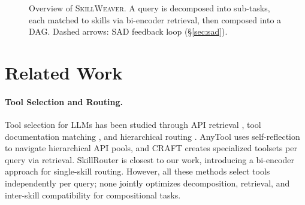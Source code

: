 \documentclass[11pt]{article}
\newcommand{\system}{\textsc{SkillWeaver}}
\begin{document}
\begin{figure}[t]
\caption{Overview of \system{}. A query is decomposed into sub-tasks, each matched to skills via bi-encoder retrieval, then composed into a DAG. Dashed arrows: SAD feedback loop (\S\ref{sec:sad}).}
\label{fig:overview}
\end{figure}

\section{Related Work}
\label{sec:related}

\paragraph{Tool Selection and Routing.}
Tool selection for LLMs has been studied through API retrieval \cite{patil2023gorilla,qin2023toolllm}, tool documentation matching \cite{hao2024toolkengpt}, and hierarchical routing \cite{xu2025skillrouter}.
AnyTool \cite{du2024anytool} uses self-reflection to navigate hierarchical API pools, and CRAFT \cite{yuan2024craft} creates specialized toolsets per query via retrieval.
SkillRouter \cite{xu2025skillrouter} is closest to our work, introducing a bi-encoder approach for single-skill routing.
However, all these methods select tools independently per query; none jointly optimizes decomposition, retrieval, and inter-skill compatibility for compositional tasks.
\end{document}
